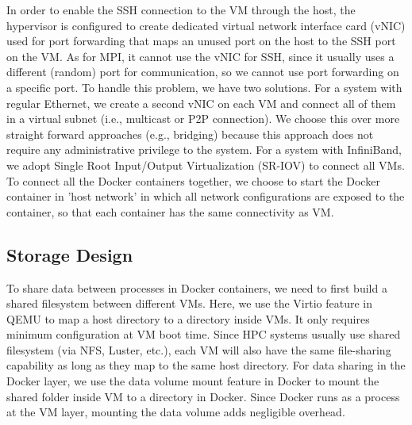 
In order to enable the SSH connection to the VM through the host, the hypervisor is configured to create dedicated virtual network interface card (vNIC) used for port forwarding that maps an unused port on the host to the SSH port on the VM. As for MPI, it cannot use the vNIC for SSH, since it usually uses a different (random) port for communication, so we cannot use port forwarding on a specific port. To handle this problem, we have two solutions. For a system with regular Ethernet, we create a second vNIC on each VM and connect all of them in a virtual subnet (i.e., multicast or P2P connection). We choose this over more straight forward approaches  (e.g., bridging) because this approach does not require any administrative privilege to the system. For a system with InfiniBand, we adopt Single Root Input/Output Virtualization (SR-IOV) to connect all VMs. To connect all the Docker containers together, we choose to start the Docker container in 'host network' in which all network configurations are exposed to the container, so that each container has the same connectivity as VM.



\subsection{Storage Design}
To share data between processes in Docker containers, we need to first build a shared filesystem between different VMs. Here, we use the Virtio feature \cite{russell2008virtio} in QEMU to map a host directory to a directory inside VMs. It only requires minimum configuration at VM boot time. Since HPC systems usually use shared filesystem (via NFS, Luster, etc.), each VM will also have the same file-sharing capability as long as they map to the same host directory. For data sharing in the Docker layer, we use the data volume mount feature in Docker to mount the shared folder inside VM to a directory in Docker. Since Docker runs as a process at the VM layer, mounting the data volume adds negligible overhead. 

